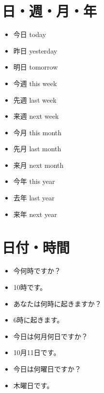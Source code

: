 \documentclass[10pt]{jsarticle}
\newcommand{\answer}[2]{{\color{orange}#2}}
\newcommand{\answer}[2]{\vspace{#1mm}}
\begin{document}
\section{日・週・月・年}
\begin{screen}
  \begin{multicols}{4}
    \begin{itemize}
      \item 今日 \answer{5}{today}
      \item 昨日 \answer{5}{yesterday}
      \item 明日 \answer{5}{tomorrow}
      \item 今週 \answer{5}{this week}
      \item 先週 \answer{5}{last week}
      \item 来週 \answer{5}{next week}
      \item 今月 \answer{5}{this month}
      \item 先月 \answer{5}{last month}
      \item 来月 \answer{5}{next month}
      \item 今年 \answer{5}{this year}
      \item 去年 \answer{5}{last year}
      \item 来年 \answer{5}{next year}
    \end{itemize}
  \end{multicols}
\end{screen}

\section{日付・時間}
\begin{screen}
  \begin{itemize}
    \item 今何時ですか？ \answer{5}{}
    \item 10時です。 \answer{5}{}
    \item あなたは何時に起きますか？ \answer{5}{}
    \item 6時に起きます。 \answer{5}{}
    \item 今日は何月何日ですか？ \answer{5}{}
    \item 10月11日です。 \answer{5}{}
    \item 今日は何曜日ですか？ \answer{5}{}
    \item 木曜日です。 \answer{5}{}
  \end{itemize}
\end{screen}
\end{document}
